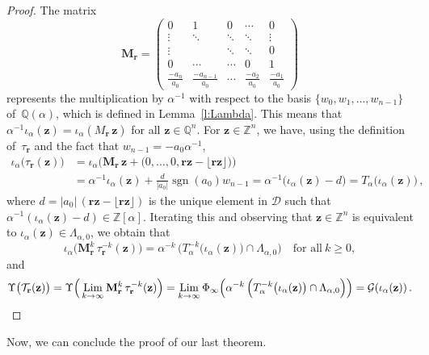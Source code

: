 \documentclass[12pt]{amsart}
\theoremstyle{definition}
\theoremstyle{remark}
\numberwithin{equation}{section}
\begin{document}
\begin{proof}
The matrix
\[
\mathbf{M}_\mathbf{r} = \begin{pmatrix}
0 & 1 & 0 & \cdots & 0 \\
\vdots & \ddots & \ddots & \ddots & \vdots \\
\vdots & & \ddots & \ddots & 0 \\
0 & \cdots & \cdots & 0 & 1 \\
\frac{-a_n}{a_0} & \frac{-a_{n-1}}{a_0} & \cdots & \frac{-a_2}{a_0} & \frac{-a_1}{a_0}
\end{pmatrix}
\]
represents the multiplication by $\alpha^{-1}$ with respect to the basis $\{w_0,w_1,\ldots,w_{n-1}\}$ of~$\mathbb{Q}(\alpha)$, which is defined in Lemma~\ref{l:Lambda}.
This means that $\alpha^{-1} \iota_\alpha(\mathbf{z}) = \iota_\alpha(M_\mathbf{r}\, \mathbf{z})$ for all $\mathbf{z} \in \mathbb{Q}^n$.
For $\mathbf{z} \in \mathbb{Z}^n$, we have, using the definition of~$\tau_\mathbf{r}$ and the fact that $w_{n-1} = - a_0 \alpha^{-1}$,
\begin{align*}
\iota_\alpha\big(\tau_\mathbf{r}(\mathbf{z})\big) & = \iota_\alpha\big(\mathbf{M}_\mathbf{r}\, \mathbf{z} + \big(0, \ldots, 0, \mathbf{r z} - \lfloor \mathbf{r z} \rfloor\big)\big) \\
& = \alpha^{-1} \iota_\alpha(\mathbf{z}) + \tfrac{d}{|a_0|} \mathop{\mathrm{sgn}}(a_0) w_{n-1} = \alpha^{-1} \big(\iota_\alpha(\mathbf{z}) - d\big) = T_\alpha\big(\iota_\alpha(\mathbf{z})\big)\,,
\end{align*}
where $d = |a_0|\, (\mathbf{r z} - \lfloor \mathbf{r z} \rfloor)$ is the unique element in $\mathcal{D}$ such that $\alpha^{-1} (\iota_\alpha(\mathbf{z}) - d) \in \mathbb{Z}[\alpha]$.
Iterating this and observing that $\mathbf{z} \in \mathbb{Z}^n$ is equivalent to $\iota_\alpha(\mathbf{z}) \in \Lambda_{\alpha,0}$, we obtain that
\[
\iota_\alpha\big(\mathbf{M}_\mathbf{r}^k\, \tau_\mathbf{r}^{-k}(\mathbf{z})\big) = \alpha^{-k}\, \Big(T_\alpha^{-k}\big(\iota_\alpha(\mathbf{z})\big) \cap \Lambda_{\alpha,0}\Big) \quad \mbox{for all}\ k \ge 0,
\]
and
\[
\Upsilon\big(\mathcal{T}_\mathbf{r}(\mathbf{z})\big) = \Upsilon\Big(\mathop{\mathrm{Lim}}_{k\to\infty} \mathbf{M}_\mathbf{r}^k\, \tau_\mathbf{r}^{-k}(\mathbf{z})\Big) = \mathop{\mathrm{Lim}}_{k\to\infty} \Phi_\infty\Big(\alpha^{-k}\, \Big(T_\alpha^{-k}\big(\iota_\alpha(\mathbf{z})\big) \cap \Lambda_{\alpha,0}\Big)\Big) = \mathcal{G}(\iota_\alpha(\mathbf{z}))\,. \qedhere
\]
\end{proof}

Now, we can conclude the proof of our last theorem.
\end{document}
